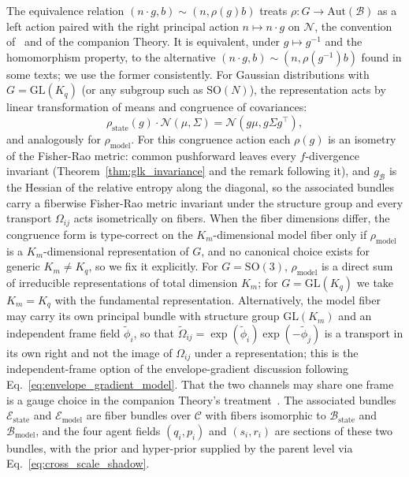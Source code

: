 The equivalence relation $(n\cdot g, b) \sim (n, \rho(g)b)$ treats $\rho: G \to \mathrm{Aut}(\mathcal{B})$ as a left action paired with the right principal action $n \mapsto n\cdot g$ on $\mathcal{N}$, the convention of~\cite{Nakahara2003} and of the companion Theory. It is equivalent, under $g \mapsto g^{-1}$ and the homomorphism property, to the alternative $(n\cdot g, b) \sim (n, \rho(g^{-1})b)$ found in some texts; we use the former consistently. For Gaussian distributions with $G = \mathrm{GL}(K_q)$ (or any subgroup such as $\mathrm{SO}(N)$), the representation acts by linear transformation of means and congruence of covariances:
\begin{equation}
\rho_{\mathrm{state}}(g) \cdot \mathcal{N}(\mu, \Sigma) = \mathcal{N}(g\mu, g\Sigma g^\top),
\end{equation}
and analogously for $\rho_{\mathrm{model}}$. For this congruence action each $\rho(g)$ is an isometry of the Fisher-Rao metric: common pushforward leaves every $f$-divergence invariant (Theorem~\ref{thm:glk_invariance} and the remark following it), and $g_{\mathcal{B}}$ is the Hessian of the relative entropy along the diagonal, so the associated bundles carry a fiberwise Fisher-Rao metric invariant under the structure group and every transport $\Omega_{ij}$ acts isometrically on fibers. When the fiber dimensions differ, the congruence form is type-correct on the $K_m$-dimensional model fiber only if $\rho_{\mathrm{model}}$ is a $K_m$-dimensional representation of $G$, and no canonical choice exists for generic $K_m \neq K_q$, so we fix it explicitly. For $G = \mathrm{SO}(3)$, $\rho_{\mathrm{model}}$ is a direct sum of irreducible representations of total dimension $K_m$; for $G = \mathrm{GL}(K_q)$ we take $K_m = K_q$ with the fundamental representation. Alternatively, the model fiber may carry its own principal bundle with structure group $\mathrm{GL}(K_m)$ and an independent frame field $\tilde{\phi}_i$, so that $\tilde{\Omega}_{ij} = \exp(\tilde{\phi}_i)\exp(-\tilde{\phi}_j)$ is a transport in its own right and not the image of $\Omega_{ij}$ under a representation; this is the independent-frame option of the envelope-gradient discussion following Eq.~\eqref{eq:envelope_gradient_model}. That the two channels may share one frame is a gauge choice in the companion Theory's treatment~\cite[Ch.~2]{DennisGaugeVFE2026}. The associated bundles $\mathcal{E}_{\mathrm{state}}$ and $\mathcal{E}_{\mathrm{model}}$ are fiber bundles over $\mathcal{C}$ with fibers isomorphic to $\mathcal{B}_{\mathrm{state}}$ and $\mathcal{B}_{\mathrm{model}}$, and the four agent fields $(q_i, p_i)$ and $(s_i, r_i)$ are sections of these two bundles, with the prior and hyper-prior supplied by the parent level via Eq.~\eqref{eq:cross_scale_shadow}.

